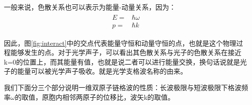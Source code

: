 \documentclass{ctexart}
\begin{document}
                一般来说，色散关系也可以表示为能量-动量关系，因为：
                \begin{align}
                    \begin{split}
                        E=&\hbar\omega\\
                        p=&\hbar k
                    \end{split}
                \end{align}
                
                因此，图\ref{fig:interact}中的交点代表能量守恒和动量守恒的点，也就是这个物理过程能够发生的点。对于光学声子，可以看出其色散关系与光子的色散关系在接近k=0的位置上，而其能量有值，也就是说二者可以进行能量交换，换句话说就是光子的能量可以被光学声子吸收。就是光学支格波名称的由来。
                
                我们下面分三个部分说明一维双原子链格波的性质：长波极限与短波极限下格波频率$\omega$的取值，原胞内相邻两原子的位移比，波矢k的取值。
                
\end{document}

